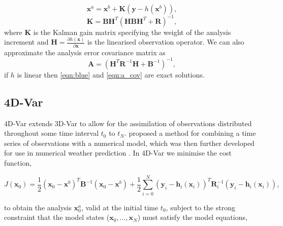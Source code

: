 \begin{equation}
\textbf{x}^{a} = \textbf{x}^{b} + \textbf{K}(\textbf{y} - h(\textbf{x}^{b})), \label{eqn:blue}
\end{equation}
\begin{equation}
\textbf{K} = \textbf{B}\textbf{H}^{T}(\textbf{H}\textbf{B}\textbf{H}^{T}+\textbf{R})^{-1},
\end{equation}
where \textbf{K} is the Kalman gain matrix specifying the weight of the analysis increment and \(\textbf{H}=\frac{\partial h(\textbf{x})}{\partial \textbf{x}}\) is the linearised observation operator. We can also approximate the analysis error covariance matrix as
\begin{equation}
\textbf{A} = (\textbf{H}^{T}\textbf{R}^{-1}\textbf{H}+\textbf{B}^{-1})^{-1}, \label{eqn:a_cov}
\end{equation}
if \( h \) is linear then \eqref{eqn:blue} and \eqref{eqn:a_cov} are exact solutions.


\subsection{4D-Var}

4D-Var extends 3D-Var to allow for the assimilation of observations distributed throughout some time interval \(t_{0}\) to \(t_{N}\). \citet{Sasaki70somebasic} proposed a method for combining a time series of observations with a numerical model, which was then further developed for use in numerical weather prediction \citep{dimet1986variational}. In 4D-Var we minimise the cost function,

\begin{equation}
J(\textbf{x}_0) = \frac{1}{2}(\textbf{x}_0-\textbf{x}^b)^{T}\textbf{B}^{-1}(\textbf{x}_0-\textbf{x}^b)+\frac{1}{2}\sum_{i=0}^{N}(\textbf{y}_i-\textbf{h}_i(\textbf{x}_i))^{T}\textbf{R}_{i}^{-1}(\textbf{y}_i-\textbf{h}_i(\textbf{x}_i)), \label{eqn:4dvar_cost}
\end{equation}

to obtain the analysis \(\textbf{x}^{a}_{0}\), valid at the initial time \(t_{0}\), subject to the strong constraint that the model states (\(\textbf{x}_0, \dots, \textbf{x}_N\)) must satisfy the model equations,


